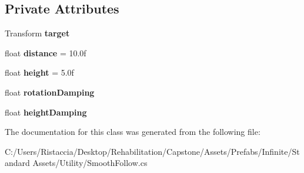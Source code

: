 \subsection*{Private Attributes}
\begin{DoxyCompactItemize}
\item 
\mbox{\label{class_unity_standard_assets_1_1_utility_1_1_smooth_follow_a8d7d8cdae94a9a77567b040f93fd7e98}} 
Transform {\bfseries target}
\item 
\mbox{\label{class_unity_standard_assets_1_1_utility_1_1_smooth_follow_a050a28a81b51e08f2b8f2397db0ce1bb}} 
float {\bfseries distance} = 10.\+0f
\item 
\mbox{\label{class_unity_standard_assets_1_1_utility_1_1_smooth_follow_a7a98b8841a32e166b8724ebba0190e15}} 
float {\bfseries height} = 5.\+0f
\item 
\mbox{\label{class_unity_standard_assets_1_1_utility_1_1_smooth_follow_a117510234fa4fa563826bcaad2e6a10a}} 
float {\bfseries rotation\+Damping}
\item 
\mbox{\label{class_unity_standard_assets_1_1_utility_1_1_smooth_follow_ae3334caaac0423c18618f4f48181f9a9}} 
float {\bfseries height\+Damping}
\end{DoxyCompactItemize}


The documentation for this class was generated from the following file\+:\begin{DoxyCompactItemize}
\item 
C\+:/\+Users/\+Ristaccia/\+Desktop/\+Rehabilitation/\+Capstone/\+Assets/\+Prefabs/\+Infinite/\+Standard Assets/\+Utility/Smooth\+Follow.\+cs\end{DoxyCompactItemize}
